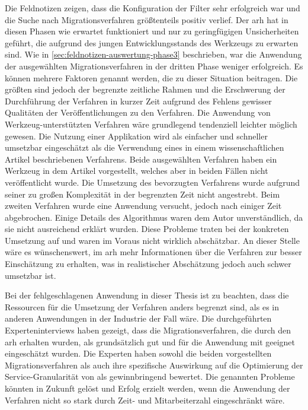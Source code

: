 Die Feldnotizen zeigen, dass die Konfiguration der Filter sehr erfolgreich war und die Suche nach Migrationsverfahren größtenteils positiv verlief.
Der \gls{arh} hat in diesen Phasen wie erwartet funktioniert und nur zu geringfügigen Unsicherheiten geführt, die aufgrund des jungen Entwicklungsstands des Werkzeugs zu erwarten sind.
Wie in \cref{sec:feldnotizen-auswertung-phase3} beschrieben, war die Anwendung der ausgewählten Migrationsverfahren in der dritten Phase weniger erfolgreich.
Es können mehrere Faktoren genannt werden, die zu dieser Situation beitragen.
Die größten sind jedoch der begrenzte zeitliche Rahmen und die Erschwerung der Durchführung der Verfahren in kurzer Zeit aufgrund des Fehlens gewisser Qualitäten der Veröffentlichungen zu den Verfahren.
Die Anwendung von Werkzeug-unterstützten Verfahren wäre grundlegend tendenziell leichter möglich gewesen.
Die Nutzung einer Applikation wird als einfacher und schneller umsetzbar eingeschätzt als die Verwendung eines in einem wissenschaftlichen Artikel beschriebenen Verfahrens.
Beide ausgewählten Verfahren haben ein Werkzeug in dem Artikel vorgestellt, welches aber in beiden Fällen nicht veröffentlicht wurde.
Die Umsetzung des bevorzugten Verfahrens wurde aufgrund seiner zu großen Komplexität in der begrenzten Zeit nicht angestrebt.
Beim zweiten Verfahren wurde eine Anwendung versucht, jedoch nach einiger Zeit abgebrochen.
Einige Details des Algorithmus waren dem Autor unverständlich, da sie nicht ausreichend erklärt wurden.
Diese Probleme traten bei der konkreten Umsetzung auf und waren im Voraus nicht wirklich abschätzbar.
An dieser Stelle wäre es wünschenswert, im \gls{arh} mehr Informationen über die Verfahren zur besser Einschätzung zu erhalten, was in realistischer Abschätzung jedoch auch schwer umsetzbar ist.

Bei der fehlgeschlagenen Anwendung in dieser Thesis ist zu beachten, dass die Ressourcen für die Umsetzung der Verfahren anders begrenzt sind, als es in anderen Anwendungen in der Industrie der Fall wäre.
Die durchgeführten Experteninterviews haben gezeigt, dass die Migrationsverfahren, die durch den \gls{arh} erhalten wurden, als grundsätzlich gut und für die Anwendung mit \jf geeignet eingeschätzt wurden.
Die Experten haben sowohl die beiden vorgestellten Migrationsverfahren als auch ihre spezifische Auswirkung auf die Optimierung der Service-Granularität von \jf als gewinnbringend bewertet.
Die genannten Probleme könnten in Zukunft gelöst und Erfolg erzielt werden, wenn die Anwendung der Verfahren nicht so stark durch Zeit- und Mitarbeiterzahl eingeschränkt wäre.

